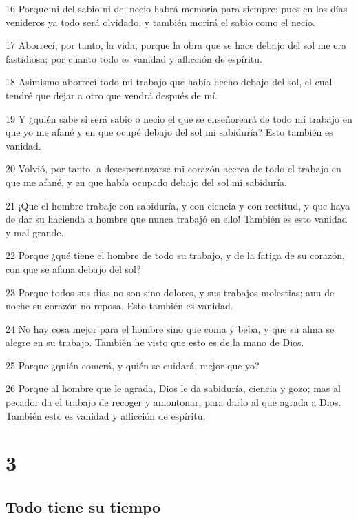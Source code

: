 \par 16 Porque ni del sabio ni del necio habrá memoria para siempre; pues en los días venideros ya todo será olvidado, y también morirá el sabio como el necio.
\par 17 Aborrecí, por tanto, la vida, porque la obra que se hace debajo del sol me era fastidiosa; por cuanto todo es vanidad y aflicción de espíritu.
\par 18 Asimismo aborrecí todo mi trabajo que había hecho debajo del sol, el cual tendré que dejar a otro que vendrá después de mí.
\par 19 Y ¿quién sabe si será sabio o necio el que se enseñoreará de todo mi trabajo en que yo me afané y en que ocupé debajo del sol mi sabiduría? Esto también es vanidad.
\par 20 Volvió, por tanto, a desesperanzarse mi corazón acerca de todo el trabajo en que me afané, y en que había ocupado debajo del sol mi sabiduría.
\par 21 ¡Que el hombre trabaje con sabiduría, y con ciencia y con rectitud, y que haya de dar su hacienda a hombre que nunca trabajó en ello! También es esto vanidad y mal grande.
\par 22 Porque ¿qué tiene el hombre de todo su trabajo, y de la fatiga de su corazón, con que se afana debajo del sol?
\par 23 Porque todos sus días no son sino dolores, y sus trabajos molestias; aun de noche su corazón no reposa. Esto también es vanidad.
\par 24 No hay cosa mejor para el hombre sino que coma y beba, y que su alma se alegre en su trabajo. También he visto que esto es de la mano de Dios.
\par 25 Porque ¿quién comerá, y quién se cuidará, mejor que yo?
\par 26 Porque al hombre que le agrada, Dios le da sabiduría, ciencia y gozo; mas al pecador da el trabajo de recoger y amontonar, para darlo al que agrada a Dios. También esto es vanidad y aflicción de espíritu.

\chapter{3}

\section*{Todo tiene su tiempo}

